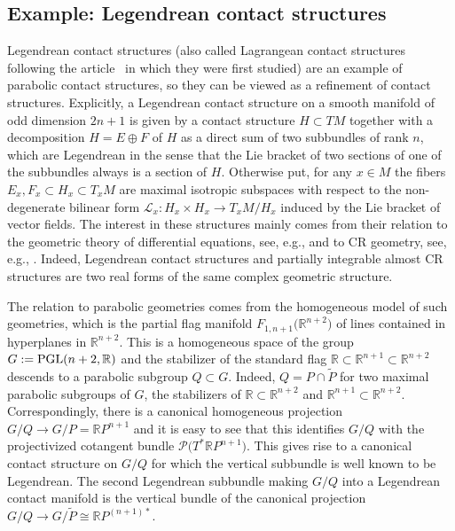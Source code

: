 \documentclass[pdftex]{sigma}
\numberwithin{equation}{section}
\def\Bbb{\mathbb}
\def\Cal{\mathcal}
\newcommand{\x}{\times}
\begin{document}
\subsection{Example: Legendrean contact structures}\label{3.4}
Legendrean contact structures (also called Lagrangean contact structures following
the article~\cite{Takeuchi} in which they were first studied) are an example of
parabolic contact structures, so they can be viewed as a refinement of contact
structures. Explicitly, a Legendrean contact structure on a smooth manifold of odd
dimension $2n+1$ is given by a contact structure $H\subset TM$ together with a
decomposition $H=E\oplus F$ of $H$ as a direct sum of two subbundles of rank $n$,
which are Legendrean in the sense that the Lie bracket of two sections of one of the
subbundles always is a section of $H$. Otherwise put, for any $x\in M$ the fibers
$E_x,F_x\subset H_x\subset T_xM$ are maximal isotropic subspaces with respect to the
non-degenerate bilinear form $\Cal L_x\colon H_x\x H_x\to T_xM/H_x$ induced by the Lie
bracket of vector fields. The interest in these structures mainly comes from their
relation to the geometric theory of differential equations, see, e.g., \cite{MFMZ} and
to CR geometry, see, e.g., \cite{Doubrov-Merker-The}. Indeed, Legendrean contact
structures and partially integrable almost CR structures are two real forms of the
same complex geometric structure.

The relation to parabolic geometries comes from the homogeneous model of such
geometries, which is the partial flag manifold $F_{1,n+1}\bigl(\Bbb R^{n+2}\bigr)$ of lines
contained in hyperplanes in $\mathbb R^{n+2}$. This is a homogeneous space of the
group $G:={\rm PGL}(n+2,\Bbb R)$ and the stabilizer of the standard flag
$\Bbb R\subset\Bbb R^{n+1}\subset\Bbb R^{n+2}$ descends to a parabolic subgroup
$Q\subset G$. Indeed, $Q=P\cap\tilde P$ for two maximal parabolic subgroups of $G$,
the stabilizers of $\Bbb R\subset\Bbb R^{n+2}$ and $\Bbb R^{n+1}\subset\Bbb
R^{n+2}$. Correspondingly, there is a canonical homogeneous projection
$G/Q\to G/P=\Bbb RP^{n+1}$ and it is easy to see that this identifies $G/Q$ with the
projectivized cotangent bundle $\Cal P\bigl(T^*\Bbb RP^{n+1}\bigr)$. This gives rise to a
canonical contact structure on $G/Q$ for which the vertical subbundle is well known
to be Legendrean. The second Legendrean subbundle making $G/Q$ into a Legendrean
contact manifold is the vertical bundle of the canonical projection
$G/Q\to G/\tilde P\cong\Bbb RP^{(n+1)*}$.
\end{document}
